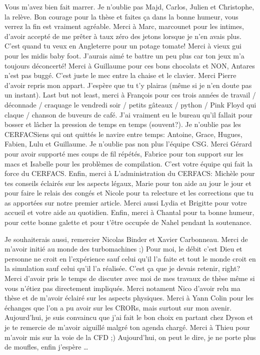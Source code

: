Vous m'avez bien fait marrer. Je n'oublie pas Majd, Carlos, Julien
et Christophe,
la relève. Bon courage pour la thèse et faites ça dans la bonne humeur, vous
verrez la fin est vraiment agréable.
Merci à Marc, marcounet pour les intimes, d'avoir accepté de me prêter à taux
zéro des
jetons lorsque je n'en avais plus. C'est quand tu veux en Angleterre pour un
potage tomate! Merci à vieux gui pour les midis baby foot. J'aurais aimé
te battre un peu plus car ton jeux m'a toujours déconcerté! 
Merci à Guillaume pour ces bons chocolats et NON, Antares n'est pas buggé.
C'est juste le mec entre la chaise et le clavier.
Merci Pierre d'avoir repris mon appart. J'espère que tu t'y plairas
(même si je n'en doute pas un instant).
Last but not least, merci à François pour ces
trois années de travail / déconnade / craquage le vendredi soir / 
petits gâteaux / python / Pink Floyd qui claque / chanson de buveurs de
café. J'ai vraiment
eu le bureau qu'il fallait pour bosser et lâcher la pression de temps
en temps (souvent?).
Je n'oublie pas les CERFACSiens qui ont quittés le navire entre temps:
Antoine, Grace, Hugues, Fabien, Lulu et Guillaume.
Je n'oublie pas non plus l'équipe CSG. Merci Gérard pour
avoir supporté mes coups de fil répétés, Fabrice pour ton
support sur les macs et Isabelle pour les problèmes de
compilation. C'est votre équipe qui fait la force du CERFACS.
Enfin, merci à L'administration du CERFACS: Michèle pour tes
conseils éclairés sur les aspects légaux, Marie pour
ton aide au jour le jour et pour faire le relais des 
congés et Nicole pour ta relecture et les
corrections que tu as apportées sur notre premier
article. Merci aussi Lydia et Brigitte pour votre accueil
et votre aide au quotidien.
Enfin, merci à Chantal pour ta bonne humeur, pour 
cette bonne galette et pour t'être occupée de
Nahel pendant la soutenance.

Je souhaiterais aussi, remercier Nicolas Binder et
Xavier Carbonneau. 
Merci de m'avoir initié au monde des turbomachines ;) Pour moi,
le débit c'est Dieu et personne ne croit en l'expérience
sauf celui qu'il l'a faite et tout le monde croit en la
simulation sauf celui qu'il l'a réalisée. 
C'est ça que je devais retenir, right?
Merci d'avoir pris le temps de 
discuter avec moi de mes travaux de thèse même si
vous n'étiez pas directement impliqués. Merci notament 
Nico d'avoir relu ma thèse et de m'avoir éclairé sur
les aspects physiques.
Merci à Yann Colin pour les échanges que l'on a pu avoir
sur les CRORs, mais surtout sur mon avenir. Aujourd'hui,
je suis convaincu que j'ai fait le bon choix en partant
chez Dyson et je te remercie
de m'avoir aiguillé malgré ton agenda chargé.
Merci à Thieu pour m'avoir mis sur la voie de la CFD ;)
Aujourd'hui, on peut le dire, je ne porte plus de moufles, enfin
j'espère \ldots{}

